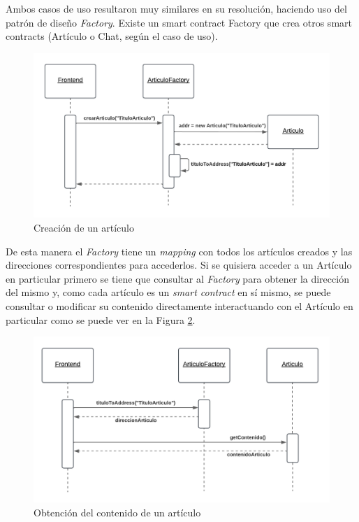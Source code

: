 Ambos casos de uso resultaron muy similares en su resolución, haciendo uso del patrón de diseño \textit{Factory}. Existe un smart contract Factory que crea otros smart contracts (Artículo o Chat, según el caso de uso).

\begin{figure}[H]
    \centering
    \includegraphics[width=0.75\linewidth]{img/ds-aw-eth-crear-articulo.png}
    \caption{Creación de un artículo}
    \label{fig:ds-aw-eth-crear-articulo}
\end{figure}

De esta manera el \textit{Factory} tiene un \textit{mapping} con todos los artículos creados y las direcciones correspondientes para accederlos. Si se quisiera acceder a un Artículo en particular primero se tiene que consultar al \textit{Factory} para obtener la dirección del mismo y, como cada artículo es un \textit{smart contract} en sí mismo, se puede consultar o modificar su contenido directamente interactuando con el Artículo en particular como se puede ver en la Figura \ref{fig:ds-aw-eth-obtener-contenido-articulo}.

\begin{figure}[H]
    \centering
    \includegraphics[width=0.75\linewidth]{img/ds-aw-eth-obtener-contenido-articulo.png}
    \caption{Obtención del contenido de un artículo}
    \label{fig:ds-aw-eth-obtener-contenido-articulo}
\end{figure}

